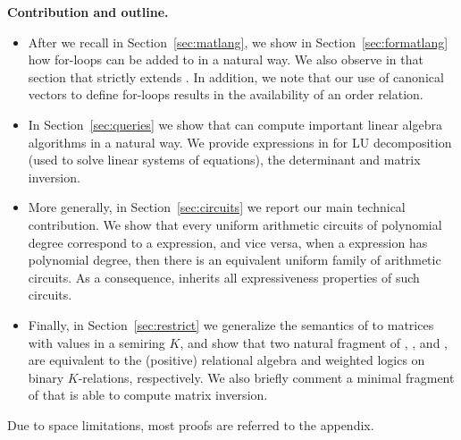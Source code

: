 \smallskip
\noindent
\textbf{Contribution and outline.} 
\begin{itemize}[leftmargin=0.5cm]
	\item After we recall \lang in Section~\ref{sec:matlang}, we show in Section~\ref{sec:formatlang}
	how for-loops can be added to \lang in a natural way. We also observe in that section that
	\langfor strictly extends \lang. In addition, we note that our use of canonical vectors to define for-loops results in the availability of an order relation.
	
	\item In Section~\ref{sec:queries} we show that \langfor can compute important linear algebra algorithms in a natural way. We provide expressions in \langfor for LU decomposition (used to solve linear systems of equations), the determinant and matrix inversion.
	\item More generally, in Section~\ref{sec:circuits} we report our main technical contribution.
	 We show that every  uniform arithmetic circuits of polynomial degree correspond to a \langfor expression, and vice versa, when a \langfor expression has polynomial degree, then there is an equivalent uniform family of arithmetic circuits. As a consequence, \langfor inherits all expressiveness properties of such circuits.
	\item  Finally, in Section~\ref{sec:restrict} we generalize the semantics of \langfor to matrices with values in a semiring $K$, and show that two natural fragment of \langfor, \langsum, and \langprod, are equivalent to the (positive) relational algebra and weighted logics on binary $K$-relations, respectively. We also briefly comment a minimal fragment of \langfor that is able to compute matrix inversion.
\end{itemize}
Due to space limitations, most proofs are referred to the appendix.
%
